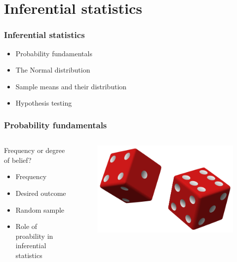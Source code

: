 \documentclass[10pt, compress]{beamer}
\begin{document}
\section{Inferential statistics}

\begin{frame}
    \frametitle{Inferential statistics}
    \begin{itemize}
        \item Probability fundamentals
        \item The Normal distribution
        \item Sample means and their distribution
        \item Hypothesis testing
    \end{itemize}
\end{frame}

\begin{frame}
    \frametitle{Probability fundamentals}
    \begin{columns}
        \begin{block}{Frequency or degree of belief?}
            \begin{itemize}
                \item Frequency
                \item Desired outcome
                \item Random sample
                \item Role of proability in inferential statistics
            \end{itemize}
        \end{block}
        \begin{block}{}
            \begin{figure}
                \begin{center}
                    \includegraphics[scale=0.2]{img/GRE_Probability.png}
                \end{center}
            \end{figure}
        \end{block}
    \end{columns}
\end{frame}
\end{document}
